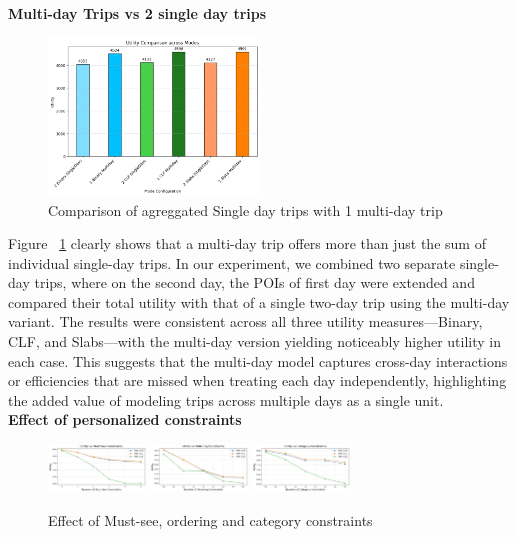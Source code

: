 \noindent\textbf{Multi-day Trips vs 2 single day trips}
\begin{figure}[H]
\centering
\includegraphics[width=0.5\textwidth]{plots/multivssingle.png}
\caption{Comparison of agreggated Single day trips with 1 multi-day trip}
\label{fig:singlevsmultiday}
\end{figure}
Figure ~\ref{fig:singlevsmultiday} clearly shows that a multi-day trip offers more than just the sum of individual single-day trips. In our experiment, we combined two separate single-day trips, where on the second day, the POIs of first day were extended and compared their total utility with that of a single two-day trip using the multi-day variant. The results were consistent across all three utility measures—Binary, CLF, and Slabs—with the multi-day version yielding noticeably higher utility in each case. This suggests that the multi-day model captures cross-day interactions or efficiencies that are missed when treating each day independently, highlighting the added value of modeling trips across multiple days as a single unit.\\

\noindent\textbf{Effect of personalized constraints}
\begin{figure}[H]
\includegraphics[width=0.23\textwidth]{plots/mustsee.png}
\includegraphics[width=0.23\textwidth]{plots/ordering.png}
\centering
\includegraphics[width=0.23\textwidth]{plots/category.png}
\caption{Effect of Must-see, ordering and category constraints}
\label{fig:personalizedconstraints}
\end{figure}

